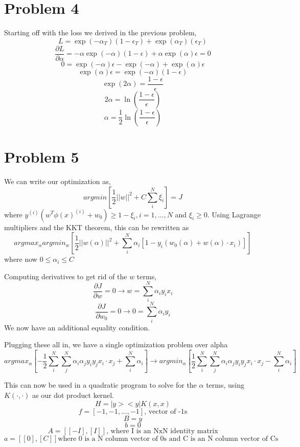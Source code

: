 \documentclass[]{article}
\begin{document}
\section*{Problem 4}
Starting off with the loss we derived in the previous problem, 
\[
L = \exp(-\alpha_{T})(1-\epsilon_{T})+\exp(\alpha_{T})(\epsilon_{T}) 
\]
\[
\frac{\partial L}{\partial\alpha} = -\alpha\exp(-\alpha)(1-\epsilon)+\alpha\exp(\alpha)\epsilon = 0
\]
\[
0 = \exp(-\alpha)\epsilon-\exp(-\alpha)+\exp(\alpha)\epsilon
\]
\[
\exp(\alpha)\epsilon=\exp(-\alpha)(1-\epsilon)
\]
\[
\exp(2\alpha)=\frac{1-\epsilon}{\epsilon}
\]
\[
2\alpha = \ln(\frac{1-\epsilon}{\epsilon})
\]
\[
\alpha = \frac{1}{2}\ln(\frac{1-\epsilon}{\epsilon})
\]
\section*{Problem 5}
We can write our optimization as,
\[
argmin[\frac{1}{2}||w||^2 + C\sum_{i}^{N}\xi_i] = J
\]
where $y^{(i)}(w^T\phi(x)^{(i)}+w_0)\geq1-\xi_i, i = 1,...,N$ and $\xi_i\geq0$.
Using Lagrange multipliers and the KKT theorem, this can be rewritten as 
\[
argmax_\alpha argmin_w [\frac{1}{2}||w(\alpha)||^2 + \sum_{i}^{N}\alpha_i[1-y_i(w_0(\alpha)+w(\alpha)\cdot x_i)]]
\]
where now $0\leq\alpha_i\leq C$

Computing derivatives to get rid of the $w$ terms,
\[
\frac{\partial J}{\partial w}= 0 \rightarrow w =\sum_{i}^{N}\alpha_iy_ix_i
\]
\[
\frac{\partial J}{\partial w_0}= 0 \rightarrow 0 =\sum_{i}^{N}\alpha_iy_i
\]
We now have an additional equality condition.

Plugging these all in, we have a single optimization problem over alpha
\[
argmax_\alpha[-\frac{1}{2}\sum_{i}^{N}\sum_{j}^{N}\alpha_i\alpha_jy_iy_jx_i\cdot x_j+\sum_{i}^{N}\alpha_i]\rightarrow argmin_\alpha[\frac{1}{2}\sum_{i}^{N}\sum_{j}^{N}\alpha_i\alpha_jy_iy_jx_i\cdot x_j-\sum_{i}^{N}\alpha_i]
\]

This can now be used in a quadratic program to solve for the $\alpha$ terms, using $K(\cdot,\cdot)$ as our dot product kernel.
\[
H = |y><y|K(x,x)
\]   
\[
f = [-1,-1,...,-1]\textrm{, vector of -1s}  
\]
\[
B= y
\]
\[
b=0
\]
\[
A = [[-I],[I]]\textrm{, where I is an NxN identity matrix}
\]
\[
a = [[0],[C]]\textrm{where 0 is a N column vector of 0s and C is an N column vector of Cs}
\]
\end{document}
